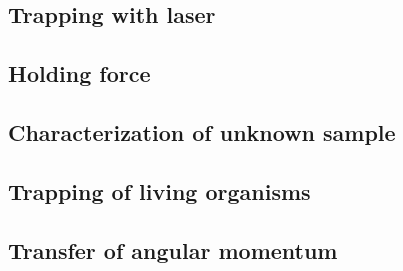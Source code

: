 \documentclass[12pt,english,ngerman]{scrartcl}
\begin{document}
\subsection{Trapping with laser}



\subsection{Holding force}


\subsection{Characterization of unknown sample}





\subsection{Trapping of living organisms}


\subsection{Transfer of angular momentum}





\newpage
\printbibliography
\listoffigures
\listoftables
\end{document}
